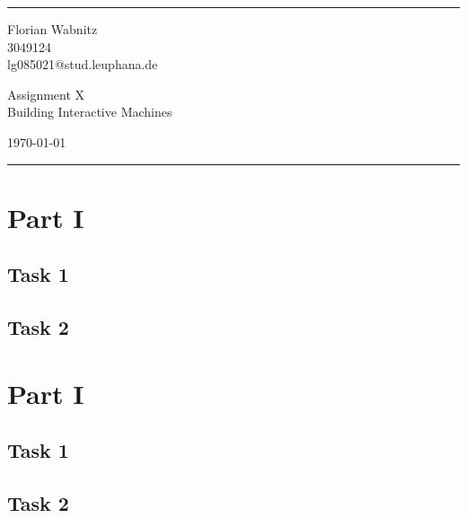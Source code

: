 \documentclass[a4paper]{article}
\makeatletter
\newcommand{\yourname}{Florian Wabnitz} %
\newcommand{\yournetid}{3049124} %
\newcommand{\youremail}{lg085021@stud.leuphana.de} %
\newcommand{\assignmentnumber}{X} %
\makeatother
\begin{document}
\fancyhead[C]{}
\hrule \medskip
\begin{minipage}{0.295\textwidth} 
\raggedright
\footnotesize
\yourname \hfill\\ 
\yournetid \hfill\\ 
\youremail
\end{minipage}
\begin{minipage}{0.4\textwidth} 
\centering 
\large 
Assignment \assignmentnumber\\ 
\normalsize 
Building Interactive Machines\\ 
\end{minipage}
\begin{minipage}{0.295\textwidth} 
\raggedleft
\today\hfill\\
\end{minipage}
\medskip\hrule 
\bigskip

\section{Part I} %

\subsection{Task 1}
\blindtext %

\subsection{Task 2}
\blindtext %

\section{Part I} %

\subsection{Task 1}
\blindtext %

\subsection{Task 2}
\blindtext %
\cite{DUMMY1} %

\newpage
\blindtext

\end{document}
